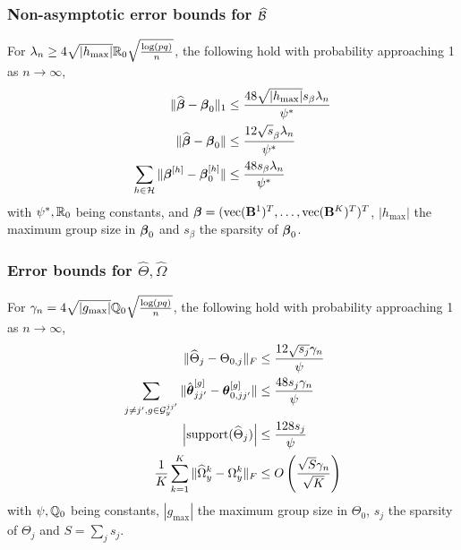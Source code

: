 \documentclass[10pt]{beamer}
\theoremstyle{definition}
\DeclareMathOperator*{\ve}{vec}
\begin{document}
\begin{frame}
\frametitle{Non-asymptotic error bounds for $\widehat {{\cal{B}}}$}

For $\lambda_n \geq 4 \sqrt{| h_{\max} |} {\mathbb{R}}_0 \sqrt{ \frac{ \log(pq)}{n}}$, the following hold with probability approaching 1 as $n \rightarrow \infty$,
%
\begin{align*}
\| \widehat {{\boldsymbol{\beta}}} - {\boldsymbol{\beta}}_0 \|_1 & \leq \frac{48 \sqrt{ | h_{\max} |} s_\beta \lambda_n}{ \psi^*} \\
\| \widehat {{\boldsymbol{\beta}}} - {\boldsymbol{\beta}}_0 \| & \leq \frac{12 \sqrt s_\beta \lambda_n}{ \psi^*} \\
\sum_{h \in {\cal{H}}} \| {\boldsymbol{\beta}}^{[h]} - {\boldsymbol{\beta}}_0^{[h]} \| & \leq \frac{48 s_\beta \lambda_n}{ \psi^*}
\end{align*}
%
with $\psi^*, {\mathbb{R}}_0$ being constants, and $\bfbeta = (\ve(\bfB^1)^T, \ldots, \ve(\bfB^K)^T)^T$, $| h_{\max} |$ the maximum group size in ${\boldsymbol{\beta}}_0$ and $s_\beta$ the sparsity of ${\boldsymbol{\beta}}_0$.
\end{frame}

\begin{frame}
\frametitle{Error bounds for $\widehat \Theta, \widehat\Omega$}

For $\gamma_n = 4 \sqrt{| g_{\max}|} {\mathbb{Q}}_0 \sqrt{ \frac{ \log(pq)}{n}}$, the following hold with probability approaching 1 as $n \rightarrow \infty$,
%
\begin{align*}
\| \widehat \Theta_j - \Theta_{0,j} \|_F & \leq \frac{12 \sqrt{s_j} \gamma_n}{\psi} \\
\sum_{j \neq j', g \in {\cal{G}}_y^{jj'}} \| \hat {{\boldsymbol{\theta}}}_{jj'}^{[g]} - {\boldsymbol{\theta}}_{0,jj'}^{[g]} \| & \leq \frac{48 s_j \gamma_n}{\psi} \\
\left| \text{support} (\widehat \Theta_j) \right| & \leq
\frac{128 s_j}{ \psi}\\
\frac{1}{K} \sum_{k=1}^K \| \widehat \Omega_y^k - \Omega_y^k \|_F & \leq
O \left( \frac{\sqrt S \gamma_n }{\sqrt K} \right)\\
\end{align*}
%
with $\psi, {\mathbb{Q}}_0$ being constants, $| g_{\max} |$ the maximum group size in $\Theta_0$, $s_j$ the sparsity of $\Theta_j$ and $S = \sum_j s_j$.
\end{frame}

\end{document}
